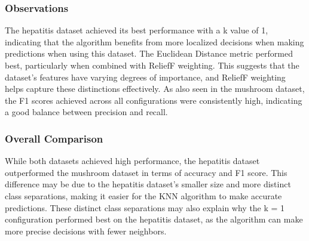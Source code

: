 \subsubsection*{Observations}
The hepatitis dataset achieved its best performance with a k value of 1, indicating that the algorithm benefits from
more localized decisions when making predictions when using this dataset.
The Euclidean Distance metric performed best, particularly when combined with ReliefF weighting. This suggests that the dataset's features
have varying degrees of importance, and ReliefF weighting helps capture these distinctions effectively.
As also seen in the mushroom dataset, the F1 scores achieved across all configurations were consistently high,
indicating a good balance between precision and recall.


\subsubsection{Overall Comparison}
While both datasets achieved high performance, the hepatitis dataset outperformed the mushroom dataset in terms of accuracy and F1 score.
This difference may be due to the hepatitis dataset's smaller size and more distinct class separations,
making it easier for the KNN algorithm to make accurate predictions. These distinct class separations may also explain why the k = 1 configuration
performed best on the hepatitis dataset, as the algorithm can make more precise decisions with fewer neighbors.



